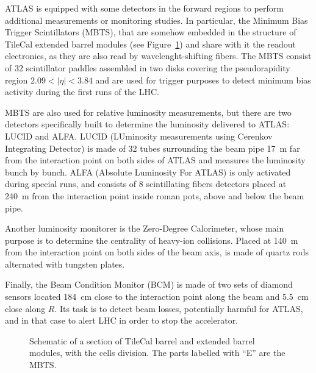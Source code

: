 ATLAS is equipped with some detectors in the forward regions to perform additional measurements or
monitoring studies. In particular, the Minimum Bias Trigger Scintillators (MBTS), that are somehow
embedded in the structure of TileCal extended barrel modules (see Figure~\ref{fig:extendedbarrel})
and share with it the readout electronics, as they are also read by wavelenght-shifting fibers.
The MBTS consist of 32 scintillator paddles assembled in two disks covering the pseudorapidity region
$2.09<|\eta|<3.84$ and are used for trigger purposes to detect minimum bias activity during the first
runs of the LHC. 

MBTS are also used for relative luminosity measurements, but there are two detectors specifically
built to determine the luminosity delivered to ATLAS: LUCID and ALFA. LUCID (LUminosity measurements
using Cerenkov Integrating Detector) is made of 32 tubes surrounding the beam pipe 17~m
far from the interaction point on both sides of ATLAS and measures the luminosity bunch by bunch.
ALFA (Absolute Luminosity For ATLAS) is only activated during special runs, and consists of 8 
scintillating fibers detectors placed at 240~m from the interaction point inside roman pots, above and
below the beam pipe.

Another luminosity monitorer is the Zero-Degree Calorimeter, whose main purpose is to determine the centrality of heavy-ion
collisions. Placed at 140~m from the interaction point on both sides of the beam axis, is made of quartz rods
alternated with tungsten plates.

Finally, the Beam Condition Monitor (BCM) is made of two sets of diamond sensors located 184~cm close
to the interaction point along the beam and 5.5~cm close along $R$. Its task is to detect beam losses,
potentially harmful for ATLAS, and in that case to alert LHC in order to stop the accelerator.



\begin{figure}[tb]\begin{center}
	\caption{Schematic of a section of TileCal barrel and extended barrel modules, with the
        cells division. The parts labelled with ``E'' are the MBTS.\label{fig:extendedbarrel}}
\end{center}\end{figure}


